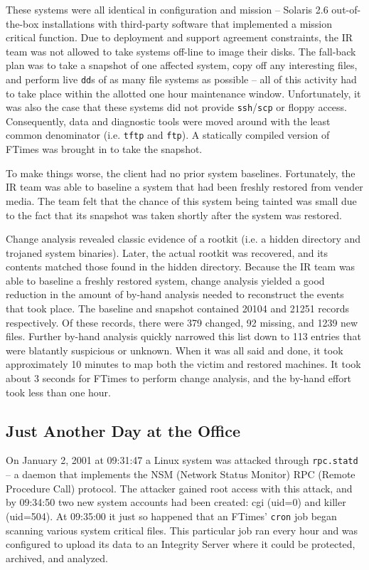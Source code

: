 \documentclass[10pt]{article}
\begin{document}
These systems were all identical in configuration and mission --
Solaris 2.6 out-of-the-box installations with third-party software
that implemented a mission critical function.  Due to deployment
and support agreement constraints, the IR team was not allowed to
take systems off-line to image their disks.  The fall-back plan
was to take a snapshot of one affected system, copy off any
interesting files, and perform live \texttt{dd}s of as many file
systems as possible -- all of this activity had to take place within
the allotted one hour maintenance window.  Unfortunately, it was
also the case that these systems did not provide \texttt{ssh}/\texttt{scp}
or floppy access.  Consequently, data and diagnostic tools were
moved around with the least common denominator (i.e.  \texttt{tftp}
and \texttt{ftp}).  A statically compiled version of FTimes was
brought in to take the snapshot.

To make things worse, the client had no prior system baselines.
Fortunately, the IR team was able to baseline a system that had
been freshly restored from vender media.  The team felt that the
chance of this system being tainted was small due to the fact that
its snapshot was taken shortly after the system was restored.

Change analysis revealed classic evidence of a rootkit (i.e. a
hidden directory and trojaned system binaries).  Later, the actual
rootkit was recovered, and its contents matched those found in
the hidden directory.  Because the IR team was able to baseline a
freshly restored system, change analysis yielded a good reduction
in the amount of by-hand analysis needed to reconstruct the events
that took place.  The baseline and snapshot contained 20104 and
21251 records respectively.  Of these records, there were 379
changed, 92 missing, and 1239 new files.  Further by-hand analysis
quickly narrowed this list down to 113 entries that were blatantly
suspicious or unknown.  When it was all said and done, it took
approximately 10 minutes to map both the victim and restored
machines.  It took about 3 seconds for FTimes to perform change
analysis, and the by-hand effort took less than one hour.

\subsection{Just Another Day at the Office}

On January 2, 2001 at 09:31:47 a Linux system was attacked through
\texttt{rpc.statd} -- a daemon that implements the NSM (Network
Status Monitor) RPC (Remote Procedure Call) protocol.  The attacker
gained root access with this attack, and by 09:34:50 two new system
accounts had been created: cgi (uid=0) and killer (uid=504).  At
09:35:00 it just so happened that an FTimes' \texttt{cron} job
began scanning various system critical files.  This particular job
ran every hour and was configured to upload its data to an Integrity
Server where it could be protected, archived, and analyzed.
\end{document}

